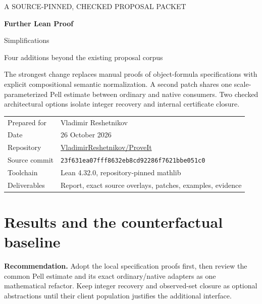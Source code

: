 \documentclass[11pt,a4paper]{article}
\newcommand{\code}[1]{\texttt{\detokenize{#1}}}
\newcommand{\repo}{https://github.com/VladimirReshetnikov/ProveIt}
\begin{document}
\hypersetup{pageanchor=false}
\begin{titlepage}
\vspace*{17mm}
{\color{accent}\large A SOURCE-PINNED, CHECKED PROPOSAL PACKET\par}
\vspace{8mm}
{\color{ink}\Huge\bfseries Further Lean Proof\par Simplifications\par}
\vspace{6mm}
{\LARGE\code{DiophantineConsistency}\par}
\vspace{10mm}
{\large Four additions beyond the existing proposal corpus\par}
\vspace{13mm}
\begin{minipage}{0.94\textwidth}
\large
The strongest change replaces manual proofs of object-formula specifications
with explicit compositional semantic normalization. A second patch shares
one scale-parameterized Pell estimate between ordinary and native consumers.
Two checked architectural options isolate integer recovery and internal
certificate closure.
\end{minipage}
\vfill
\begin{tabular}{@{}ll@{}}
Prepared for & Vladimir Reshetnikov\\[4pt]
Date & 26 October 2026\\[4pt]
Repository & \href{\repo}{VladimirReshetnikov/ProveIt}\\[4pt]
Source commit & \texttt{23f631ea07fff8632eb8cd92286f7621bbe051c0}\\[4pt]
Toolchain & Lean 4.32.0, repository-pinned mathlib\\[4pt]
Deliverables & Report, exact source overlays, patches, examples, evidence
\end{tabular}
\vspace{8mm}
\end{titlepage}
\hypersetup{pageanchor=true}
\tableofcontents
\newpage
{}

\section{Results and the counterfactual baseline}

\textbf{Recommendation.} Adopt the local specification proofs first, then
review the common Pell estimate and its exact ordinary/native adapters as one
mathematical refactor. Keep integer recovery and observed-set closure as
optional abstractions until their client population justifies the additional
interface.
\end{document}
